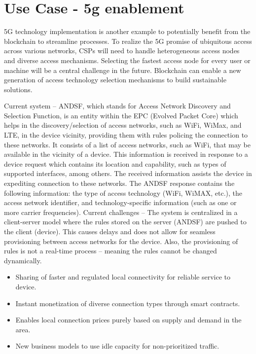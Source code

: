 \documentclass[12pt]{article}
\begin{document}
\section{Use Case - 5g enablement}
5G technology implementation is another
example to potentially benefit from the
blockchain to streamline processes. To
realize the 5G promise of ubiquitous access
across various networks, CSPs will need
to handle heterogeneous access nodes
and diverse access mechanisms. Selecting
the fastest access node for every user
or machine will be a central challenge in
the future. Blockchain can enable a new
generation of access technology selection
mechanisms to build sustainable solutions.

Current system – ANDSF, which stands for
Access Network Discovery and Selection
Function, is an entity within the EPC
(Evolved Packet Core) which helps in the
discovery/selection of access networks,
such as WiFi, WiMax, and LTE, in the device
vicinity, providing them with rules policing
the connection to these networks. It consists
of a list of access networks, such as
WiFi, that may be available in the vicinity of
a device. This information is received in response
to a device request which contains
its location and capability, such as types of
supported interfaces, among others. The
received information assists the device in
expediting connection to these networks.
The ANDSF response contains the following
information: the type of access
technology (WiFi, WiMAX, etc.), the access
network identifier, and technology-specific
information (such as one or more carrier
frequencies).
Current challenges – The system is centralized
in a client-server model where the
rules stored on the server (ANDSF) are
pushed to the client (device). This causes
delays and does not allow for seamless
provisioning between access networks for
the device. Also, the provisioning of rules is
not a real-time process – meaning the rules
cannot be changed dynamically.

\begin{itemize}
	\item Sharing of faster and regulated
	local connectivity for reliable
	service to device.
	\item Instant monetization of diverse
	connection types through smart
	contracts.
	\item Enables local connection prices
	purely based on supply and
	demand in the area.
	\item New business models to use idle
	capacity for non-prioritized traffic.
	
\end{itemize}
\frameboxend
\end{document}
